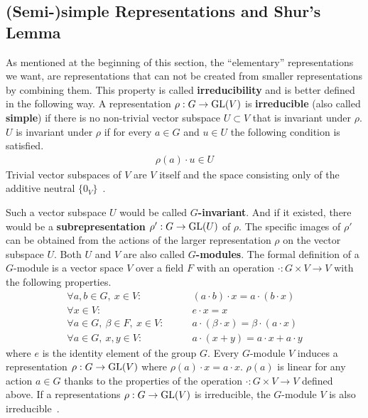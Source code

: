 \subsection{(Semi-)simple Representations and Shur's Lemma}
\label{sec:reprep.simp}

As mentioned at the beginning of this section, the ``elementary'' representations we want, are representations that can not be created from smaller representations by combining them.
This property is called \textbf{irreducibility} and is better defined in the following way.
A representation $\rho: G \to \operatorname{GL}(V)$ is \textbf{irreducible} (also called \textbf{simple}) if there is no non-trivial vector subspace $U \subset V$ that is invariant under $\rho$.
$U$ is invariant under $\rho$ if for every $a \in G$ and $u \in U$ the following condition is satisfied.
\begin{align}
    \rho(a) \cdot u \in U
\end{align}
Trivial vector subspaces of $V$ are $V$ itself and the space consisting only of the additive neutral $\{0_V\}$~\cite{hein2013}.

Such a vector subspace $U$ would be called \textbf{$G$-invariant}.
And if it existed, there would be a \textbf{subrepresentation} $\rho': G \to \operatorname{GL}(U)$ of $\rho$.
The specific images of $\rho'$ can be obtained from the actions of the larger representation $\rho$ on the vector subspace $U$.
Both $U$ and $V$ are also called \textbf{$G$-modules}.
The formal definition of a $G$-module is a vector space $V$ over a field $F$ with an operation $\cdot: G \times V \to V$ with the following properties.
\begin{subequations}
    \begin{align}
        \forall a, b \in G,\ x \in V: \qquad & (a \cdot b) \cdot x = a \cdot (b \cdot x) \\
        \forall x \in V: \qquad & e \cdot x = x \\
        \forall a \in G,\ \beta \in F,\ x \in V: \qquad & a \cdot (\beta \cdot x) = \beta \cdot (a \cdot x) \\
        \forall a \in G,\ x, y \in V: \qquad & a \cdot (x + y) = a \cdot x + a \cdot y
    \end{align}
\end{subequations}
where $e$ is the identity element of the group $G$.
Every $G$-module $V$ induces a representation $\rho: G \to \operatorname{GL}(V)$ where $\rho(a) \cdot x = a \cdot x$.
$\rho(a)$ is linear for any action $a \in G$ thanks to the properties of the operation $\cdot: G \times V \to V$ defined above.
If a representations $\rho: G \to \operatorname{GL}(V)$ is irreducible, the $G$-module $V$ is also irreducible~\cite{hein2013}.

